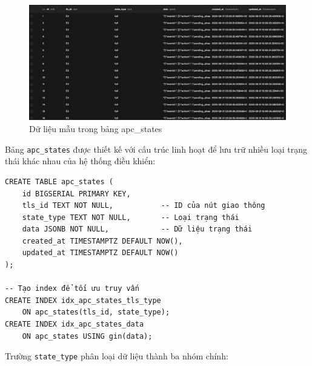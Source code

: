 \begin{figure}[H]
    \centering
    \includegraphics[width=1\linewidth]{tut.png}
    \caption{Dữ liệu mẫu trong bảng apc\_states}
    \label{fig:apc_states_data}
\end{figure}

Bảng \texttt{apc\_states} được thiết kế với cấu trúc linh hoạt để lưu trữ nhiều loại trạng thái khác nhau của hệ thống điều khiển:

\begin{lstlisting}[style=sql,caption={Định nghĩa cấu trúc bảng apc\_states}]
CREATE TABLE apc_states (
    id BIGSERIAL PRIMARY KEY,
    tls_id TEXT NOT NULL,           -- ID của nút giao thông
    state_type TEXT NOT NULL,       -- Loại trạng thái
    data JSONB NOT NULL,            -- Dữ liệu trạng thái
    created_at TIMESTAMPTZ DEFAULT NOW(),
    updated_at TIMESTAMPTZ DEFAULT NOW()
);

-- Tạo index để tối ưu truy vấn
CREATE INDEX idx_apc_states_tls_type 
    ON apc_states(tls_id, state_type);
CREATE INDEX idx_apc_states_data 
    ON apc_states USING gin(data);
\end{lstlisting}

Trường \texttt{state\_type} phân loại dữ liệu thành ba nhóm chính:

